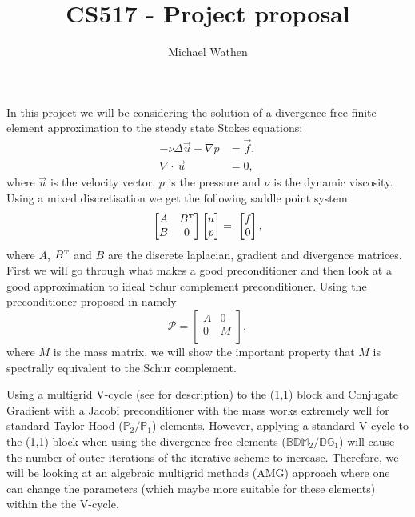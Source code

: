 \documentclass[10pt]{article}
\numberwithin{equation}{section}    %
\renewcommand{\div}{\nabla\cdot\,}
\newcommand{\U}{\vec u}
\newcommand{\Bt}{B^{\mbox{\tiny{T}}}}
\begin{document}
\pagestyle{fancyplain}
\fancyhead{}
\fancyfoot{} %
\fancyfoot[LE,RO]{\thepage \hspace{-5mm}}
\fancyfoot[CO,RE]{}

\title{CS517 - Project proposal}
\author{Michael Wathen}
\maketitle

In this project we will be considering the solution of a divergence free finite element approximation to the steady state Stokes equations:
\begin{equation} \label{eq:Stokes}
    \begin{aligned}
        -\nu \Delta \U- \nabla p &= \vec f,\\
        \div \U     &= 0,
    \end{aligned}
\end{equation}
where $\U$ is the velocity vector, $p$ is the pressure and $\nu$ is the dynamic viscosity. Using a mixed discretisation we get the following saddle point system
$$\begin{bmatrix}
A & \Bt\\
B & 0\\
\end{bmatrix} \begin{bmatrix}
u \\
p \\
\end{bmatrix} = \ \begin{bmatrix}
f \\
0 \\
\end{bmatrix},$$
where $A$, $\Bt$ and $B$ are the discrete laplacian, gradient and divergence matrices. First we will go through what makes a good preconditioner and then look at a good approximation to ideal Schur complement preconditioner. Using the preconditioner proposed in \cite{Wathen1993,Silvester1994} namely
$$\mathcal{P} = \begin{bmatrix}
A & 0\\
0 & M\\
\end{bmatrix},$$
where $M$ is the mass matrix, we will show the important property that $M$ is spectrally equivalent to the Schur complement.

Using a multigrid V-cycle  (see \cite{Trottenberg2000,Briggs2000} for description) to the (1,1) block and Conjugate Gradient \cite{Hestenes1952} with a Jacobi preconditioner with the mass works extremely well for standard Taylor-Hood ($\mathbb{P}_2/\mathbb{P}_1$) elements. However, applying a standard V-cycle to the (1,1) block when using the divergence free elements ($\mathbb{BDM}_2/\mathbb{DG}_1$) will cause the number of outer iterations of the iterative scheme to increase. Therefore, we will be looking at an algebraic multigrid methods (AMG) approach where one can change the parameters (which maybe more suitable for these elements) within the the V-cycle.



\end{document}
